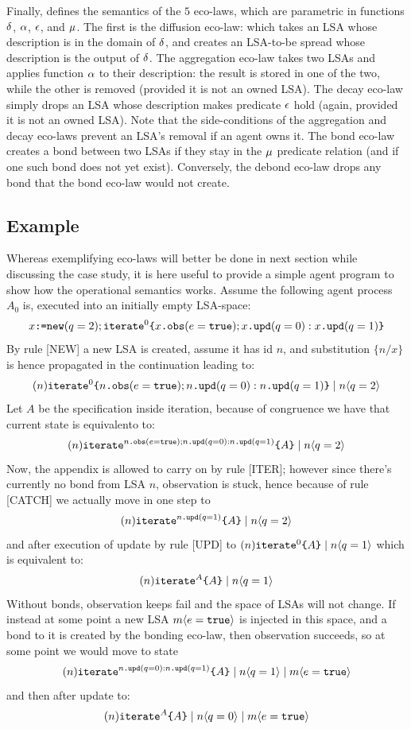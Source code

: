 \documentclass[12pt,a4paper,twoside,openright]{book}
\begin{document}
Finally,  defines the semantics of the $5$ eco-laws, which are parametric in functions $\fDiff$, $\fAggr$, $\fDecay$, and $\fBond$.
%
The first is the diffusion eco-law: which takes an LSA whose description is in the domain of $\fDiff$, and creates an LSA-to-be spread whose description is the output of $\fDiff$.
%
The aggregation eco-law takes two LSAs and applies function $\fAggr$ to their description: the result is stored in one of the two, while the other is removed (provided it is not an owned LSA).
%
The decay eco-law simply drops an LSA whose description makes predicate $\fDecay$ hold (again, provided it is not an owned LSA).
%
Note that the side-conditions of the aggregation and decay eco-laws prevent an LSA's removal if an agent owns it.
%
The bond eco-law creates a bond between two LSAs if they stay in the $\fBond$ predicate relation (and if one such bond does not yet exist).
%
Conversely, the debond eco-law drops any bond that the bond eco-law would not create.

\subsection{Example}
\label{sapere-semantics-example}

Whereas exemplifying eco-laws will better be done in next section while discussing the case study, it is here useful to provide a simple agent program to show how the operational semantics works.
%
Assume the following agent process $A_0$ is, executed into an initially empty LSA-space:
%
\[\cNew{x}{q=2};\cRecR{\cObs{x}{e=\texttt{true}};\cUpd{x}{q=0}:\cUpd{x}{q=1}}{0}\]
%
By rule [NEW] a new LSA is created, assume it has id $n$, and substitution $\{n/x\}$ is hence propagated in the continuation leading to:
%
\[(n)\cRecR{\cObs{n}{e=\texttt{true}};\cUpd{n}{q=0}:\cUpd{n}{q=1}}{0}\oCPar\cLSA{n}{q=2}\]
%
Let $A$ be the specification inside iteration, because of congruence we have that current state is equivalento to:
%
\[(n)\cRecR{A}{\cObs{n}{e=\texttt{true}};\cUpd{n}{q=0}:\cUpd{n}{q=1}}\oCPar\cLSA{n}{q=2}\]
%
Now, the appendix is allowed to carry on by rule [ITER]; however since there's currently no bond from LSA $n$, observation is stuck, hence because of rule [CATCH] we actually move in one step to
%
\[(n)\cRecR{A}{\cUpd{n}{q=1}}\oCPar\cLSA{n}{q=2}\]
%
and after execution of update by rule [UPD] to \mbox{$(n)\cRecR{A}{0}\oCPar\cLSA{n}{q=1}$} which is equivalent to:
%
\[(n)\cRecR{A}{A}\oCPar\cLSA{n}{q=1}\]
%
Without bonds, observation keeps fail and the space of LSAs will not change.
%
If instead at some point a new LSA $\cLSA{m}{e=\texttt{true}}$ is injected in this space, and a bond to it is created by the bonding eco-law, then observation succeeds, so at some point we would move to state
%
\[(n)\cRecR{A}{\cUpd{n}{q=0}:\cUpd{n}{q=1}}\oCPar\cLSA{n}{q=1}\oCPar\cLSA{m}{e=\texttt{true}}\]
%
and then after update to:
%
\[(n)\cRecR{A}{A}\oCPar\cLSA{n}{q=0}\oCPar\cLSA{m}{e=\texttt{true}}\]
\end{document}
